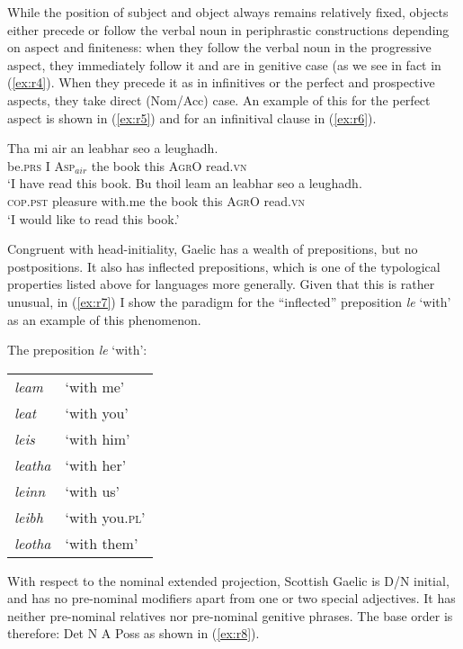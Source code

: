 \documentclass[output=paper,colorlinks,citecolor=brown]{langscibook}
\begin{document}
While the position of subject and object always remains relatively fixed, objects  either precede or follow the verbal noun in periphrastic constructions depending on aspect and finiteness: when they follow the verbal noun in the progressive aspect, they immediately follow it and are in genitive case (as we see in fact in (\ref{ex:r4}). When they precede it as in infinitives or the perfect and prospective aspects, they take direct (Nom/Acc) case. An example of this for the perfect aspect is shown in (\ref{ex:r5}) and for an infinitival clause in (\ref{ex:r6}). 

\ea\label{ex:r5}
\gll Tha  mi  air  an leabhar seo  a  leughadh. \\
be.\textsc{prs}  I  \textsc{Asp}$_{air}$  the book this  \textsc{AgrO} read.\textsc{vn} \\
\glt `I have read this book.
\ex\label{ex:r6}
\gll Bu thoil  leam  an leabhar seo  a leughadh.\\
\textsc{cop.}\textsc{pst} pleasure  with.me  the book this  \textsc{AgrO} read.\textsc{vn} \\
\glt `I would like to read this book.'
\z

Congruent with head-initiality, Gaelic has a wealth of prepositions, but no postpositions. It also has inflected prepositions, which is one of the typological properties listed above for  languages more generally. Given that this is rather unusual, in (\ref{ex:r7}) I show the paradigm for the “inflected” preposition \textit{le} `with' as an example of this phenomenon. 

\ea\label{ex:r7}
The preposition \textit{le} `with':\smallskip\\
\begin{tabular}{@{}ll@{}}
\textit{leam} & `with me' \\
\textit{leat} & `with you' \\
\textit{leis} & `with him' \\
\textit{leatha} & `with her' \\
\textit{leinn} & `with us' \\
\textit{leibh} & `with you.\textsc{pl}'\\
\textit{leotha} & `with them' \\
\end{tabular}
\z

With respect to the nominal extended projection, Scottish Gaelic is D/N initial, and has no pre-nominal modifiers apart from one or two special adjectives. It has neither pre-nominal relatives nor pre-nominal genitive phrases. The base order is therefore: Det N A Poss as shown in (\ref{ex:r8}). 
\end{document}

